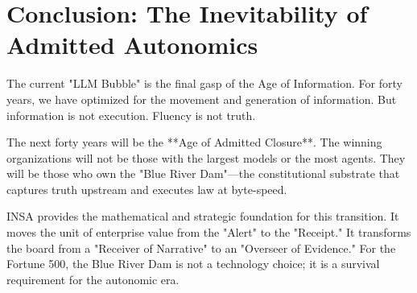 \documentclass[12pt,a4paper,oneside]{book}
\begin{document}
\chapter{Conclusion: The Inevitability of Admitted Autonomics}

The current "LLM Bubble" is the final gasp of the Age of Information. For forty years, we have optimized for the movement and generation of information. But information is not execution. Fluency is not truth. 

The next forty years will be the **Age of Admitted Closure**. The winning organizations will not be those with the largest models or the most agents. They will be those who own the "Blue River Dam"---the constitutional substrate that captures truth upstream and executes law at byte-speed. 

INSA provides the mathematical and strategic foundation for this transition. It moves the unit of enterprise value from the "Alert" to the "Receipt." It transforms the board from a "Receiver of Narrative" to an "Overseer of Evidence." For the Fortune 500, the Blue River Dam is not a technology choice; it is a survival requirement for the autonomic era.
\end{document}
